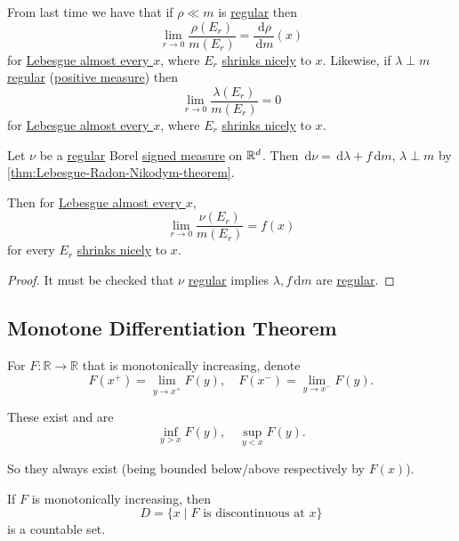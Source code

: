 From last time we have that if \(\rho \ll m\) is \hyperref[def:regular]{regular} then
\[
	\lim_{r \to 0} \frac{\rho(E_r)}{m(E_r)} = \frac{\,\mathrm{d}\rho}{\,\mathrm{d}m}(x)
\]
for \hyperref[def:mu-almost-everywhere]{Lebesgue almost every \(x\)}, where \(E_r\) \hyperref[def:shrink-nicely]{shrinks nicely} to \(x\).
Likewise, if \(\lambda \perp m\) \hyperref[def:regular]{regular} (\hyperref[def:signed-measure]{positive measure}) then
\[
	\lim_{r \to 0} \frac{\lambda(E_r)}{m(E_r)} = 0
\]
for \hyperref[def:mu-almost-everywhere]{Lebesgue almost every \(x\)}, where \(E_r\) \hyperref[def:shrink-nicely]{shrinks nicely} to \(x\).

\begin{theorem}\label{thm:Lebesgue-differentiation-theorem-for-regular-measure}
	Let \(\nu\) be a \hyperref[def:regular]{regular} Borel \hyperref[def:signed-measure]{signed measure} on \(\mathbb{\MakeUppercase{r}} ^d\).
	Then \(\,\mathrm{d}\nu = \,\mathrm{d}\lambda + f \,\mathrm{d}m\), \(\lambda \perp m\) by \autoref{thm:Lebesgue-Radon-Nikodym-theorem}.

	Then for \hyperref[def:mu-almost-everywhere]{Lebesgue almost every \(x\)},
	\[
		\lim_{r \to 0} \frac{\nu(E_r)}{m(E_r)} = f(x)
	\]
	for every \(E_r\) \hyperref[def:shrink-nicely]{shrinks nicely} to \(x\).
\end{theorem}
\begin{proof}
	It must be checked that \(\nu\) \hyperref[def:regular]{regular} implies \(\lambda, f \,\mathrm{d}m\) are \hyperref[def:regular]{regular}.
\end{proof}

\subsection{Monotone Differentiation Theorem}
\begin{definition}[]\label{def:}
	For \(F \colon  \mathbb{R} \to \mathbb{R}\) that is monotonically increasing, denote
	\[
		F(x^+) = \lim_{y \to x^+} F(y), \quad F(x^-) = \lim_{y \to x^-} F(y).
	\]

	These exist and are
	\[
		\inf_{y > x} F(y),\quad \sup_{y < x} F(y).
	\]

	So they always exist (being bounded below/above respectively by \(F(x)\)).
\end{definition}

\begin{lemma}\label{lma:lec-33}
	If \(F\) is monotonically increasing, then
	\[
		D = \{x \mid F \text{ is discontinuous at } x\}
	\]
	is a countable set.
\end{lemma}

